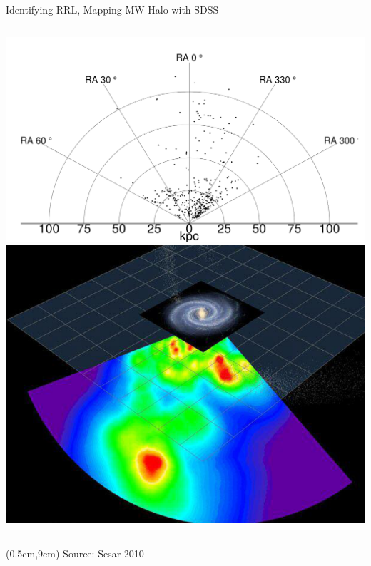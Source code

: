 \documentclass[12pt]{beamer}
\newcommand{\todo}[1]{{\color{red}TODO: #1}}
\newcommand{\att}[1]{\begin{textblock*}{12cm}(0.5cm,9cm) %
  {\tiny Source: #1}
      \end{textblock*}}
\begin{document}
\begin{frame}{Identifying RRL, Mapping MW Halo with SDSS}
\begin{columns}
\begin{column}{0.5\textwidth}
      \vspace{-.35in}
      \begin{center}
      \includegraphics[scale=.1]{figs/density_true_points.png}\\
      \includegraphics[scale=.17]{figs/sesar_map.png}
      \end{center}
    \end{column}
\end{columns}

\att{Sesar 2010 \cite{sesar2010light}}
  
\end{frame}

\end{document}
